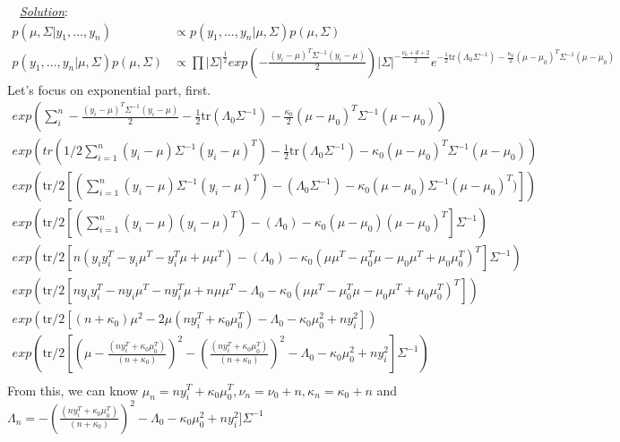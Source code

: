 \documentclass[twoside]{article}
\newenvironment{solution}{
  \begin{flushleft} \noindent ~~\underline{\emph{Solution}}: \rmfamily}{\end{flushleft}}
\begin{document}
\begin{solution}
\begin{equation}
\begin{split}
p(\mu, \Sigma | y_1, \dots, y_n) &\propto p(y_1, \dots, y_n | \mu, \Sigma)p(\mu, \Sigma) \\
p(y_1, \dots, y_n | \mu, \Sigma)p(\mu,\Sigma) &\propto \prod |\Sigma|^{\frac{1}{2}}exp(-\frac{(y_i-\mu)^T\Sigma^{-1}(y_i-\mu)}{2})
|\Sigma|^{-\frac{\nu_0+d+2}{2}}e^{-\frac{1}{2}\mbox{tr}(\Lambda_0\Sigma^{-1}) - \frac{\kappa_0}{2}(\mu-\mu_0)^T\Sigma^{-1}(\mu-\mu_0)}
\end{split}
\end{equation}
Let's focus on exponential part, first.
\begin{equation}
\begin{split}
exp(\sum_i^n-\frac{(y_i-\mu)^T\Sigma^{-1}(y_i-\mu)}{2}-\frac{1}{2}\mbox{tr}(\Lambda_0\Sigma^{-1}) - \frac{\kappa_0}{2}(\mu-\mu_0)^T\Sigma^{-1}(\mu-\mu_0)) \\
exp( tr(1/2 \sum_{i=1}^n(y_i-\mu)\Sigma^{-1}(y_i-\mu)^T)-\frac{1}{2}\mbox{tr}(\Lambda_0\Sigma^{-1}) -\kappa_0(\mu-\mu_0)^T\Sigma^{-1}(\mu-\mu_0))\\
exp( \mbox{tr}/2 [(\sum_{i=1}^n(y_i-\mu)\Sigma^{-1}(y_i-\mu)^T)-(\Lambda_0\Sigma^{-1}) - \kappa_0(\mu-\mu_0)\Sigma^{-1}(\mu-\mu_0)^T) ])\\
exp( \mbox{tr}/2 [(\sum_{i=1}^n(y_i-\mu)(y_i-\mu)^T)-(\Lambda_0) - \kappa_0(\mu-\mu_0)(\mu-\mu_0)^T] \Sigma^{-1})\\
exp( \mbox{tr}/2 [n(y_i y_i^T- y_i\mu^T - y_i^T\mu +\mu\mu^T)-(\Lambda_0) - \kappa_0(\mu\mu^T-\mu_0^T\mu -\mu_0\mu^T+\mu_0\mu^T_0)^T] \Sigma^{-1})\\
exp( \mbox{tr}/2 [n y_iy_i^T-n y_i\mu^T - n y_i^T\mu +n \mu\mu^T -\Lambda_0 - \kappa_0(\mu\mu^T-\mu_0^T\mu -\mu_0\mu^T+\mu_0\mu^T_0)^T] )\\
exp( \mbox{tr}/2 [(n+\kappa_0)\mu^2 -2\mu(n y_i^T+\kappa_0\mu_0^T) -\Lambda_0 - \kappa_0\mu_0^2+ny_i^2]) \\
exp( \mbox{tr}/2 [(\mu - \frac{(n y_i^T+\kappa_0\mu_0^T)}{(n+\kappa_0)})^2 - (\frac{(n y_i^T+\kappa_0\mu_0^T)}{(n+\kappa_0)})^2 -\Lambda_0 - \kappa_0\mu_0^2+ny_i^2] \Sigma^{-1})\\
\end{split}
\end{equation}
From this, we can know $\mu_n = n y_i^T+\kappa_0\mu_0^T, \nu_n = \nu_0+n, \kappa_n = \kappa_0+n$ and $\Lambda_n = - (\frac{(n y_i^T+\kappa_0\mu_0^T)}{(n+\kappa_0)})^2 -\Lambda_0 - \kappa_0\mu_0^2+ny_i^2] \Sigma^{-1}$
\end{solution}
\end{document}
